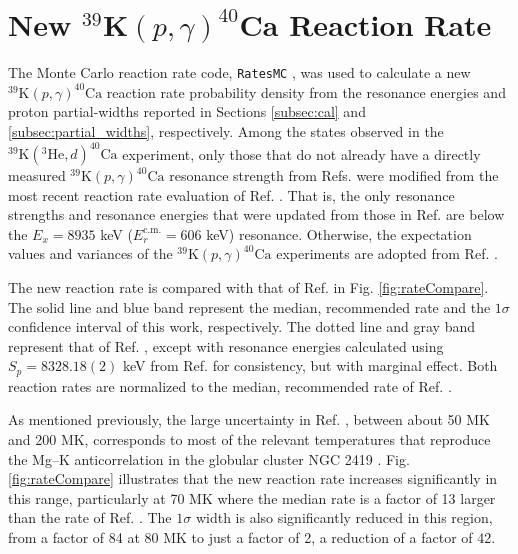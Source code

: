 \section{New $^{39}\mathrm{\textbf{K}}(p,\gamma)^{40}\mathrm{\textbf{Ca}}$ Reaction Rate} \label{sec:pg_reac_rate}

The Monte Carlo reaction rate code, \texttt{RatesMC} \cite{Longland2010a,RatesMC}, was used to calculate a new $^{39}\mathrm{K}(p, \gamma)^{40}\mathrm{Ca}$ reaction rate probability density from the resonance energies and proton partial-widths reported in Sections \ref{subsec:cal} and \ref{subsec:partial_widths}, respectively. Among the states observed in the $^{39}\mathrm{K}(^{3}\mathrm{He},d)^{40}\mathrm{Ca}$ experiment, only those that do not already have a directly measured $^{39}\mathrm{K}(p, \gamma)^{40}\mathrm{Ca}$ resonance strength from Refs. \cite{Kikstra1990,Cheng1981,Leenhouts1966} were modified from the most recent reaction rate evaluation of Ref. \cite{Longland2018}. That is, the only resonance strengths and resonance energies that were updated from those in Ref. \cite{Longland2018} are below the $E_{x} = 8935$ keV ($E^{\mathrm{c.m.}}_{r} = 606$ keV) resonance. Otherwise, the expectation values and variances of the $^{39}\mathrm{K}(p, \gamma)^{40}\mathrm{Ca}$ experiments \cite{Kikstra1990,Cheng1981,Leenhouts1966} are adopted from Ref. \cite{Longland2018}.


The new reaction rate is compared with that of Ref. \cite{Longland2018} in Fig. \ref{fig:rateCompare}. The solid line and blue band represent the median, recommended rate and the $1\sigma$ confidence interval of this work, respectively. The dotted line and gray band represent that of Ref. \cite{Longland2018}, except with resonance energies calculated using $S_{p} = 8328.18(2)$ keV from Ref. \cite{Wang2021} for consistency, but with marginal effect. Both reaction rates are normalized to the median, recommended rate of Ref. \cite{Longland2018}. %

As mentioned previously, the large uncertainty in Ref. \cite{Longland2018}, between about 50 MK and 200 MK, corresponds to most of the relevant temperatures that reproduce the Mg--K anticorrelation in the globular cluster NGC 2419 \cite{Iliadis2016}. 
Fig. \ref{fig:rateCompare} illustrates that the new reaction rate increases significantly in this range, particularly at 70 MK where the median rate is a factor of 13 larger than the rate of Ref. \cite{Longland2018}. The $1\sigma$ width is also significantly reduced in this region, from a factor of 84 at 80 MK to just a factor of 2, a reduction of a factor of 42.

